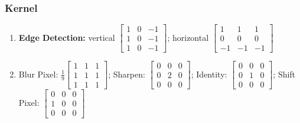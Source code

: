 \documentclass[11pt,a4paper]{article}
\begin{document}
\subsubsection*{Kernel}
\begin{enumerate}
    \item \textbf{Edge Detection:} vertical $\begin{bmatrix}
        1&0&-1\\
        1&0&-1\\
        1&0&-1
    \end{bmatrix}$; horizontal $\begin{bmatrix}
        1&1&1\\
        0&0&0\\
        -1&-1&-1
    \end{bmatrix}$
    \item {Blur Pixel:} $\frac{1}{9}\begin{bmatrix}
        1&1&1\\
        1&1&1\\
        1&1&1
    \end{bmatrix}$; 
    {Sharpen:} $\begin{bmatrix}
        0&0&0\\
        0&2&0\\
        0&0&0
    \end{bmatrix}$; 
    {Identity:} $\begin{bmatrix}
        0&0&0\\
        0&1&0\\
        0&0&0
    \end{bmatrix}$; 
    {Shift Pixel:} $\begin{bmatrix}
        0&0&0\\
        1&0&0\\
        0&0&0
    \end{bmatrix}$
\end{enumerate}
\end{document}
